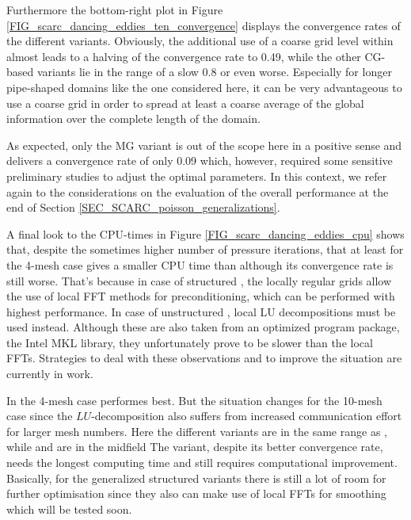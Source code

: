Furthermore the bottom-right plot in Figure \ref{FIG_scarc_dancing_eddies_ten_convergence} displays the convergence rates of the different \scarc{} variants. 
Obviously, the additional use of a coarse grid level within \scarctwolevel{} almost leads to a halving of the convergence rate to 0.49, while the other CG-based variants lie in the range of a slow 0.8 or even worse. Especially for longer pipe-shaped domains like the one considered here, it can be very advantageous to use a coarse grid in order to spread at least a coarse average of the global information over the complete length of the domain. 

As expected, only the MG variant is out of the scope here in a positive sense and delivers a convergence rate of only 0.09 which, however, required some sensitive preliminary studies to adjust the optimal parameters. In this context, we refer again to the considerations on the evaluation of the overall performance at the end of Section \ref{SEC_SCARC_poisson_generalizations}.
 

A final look to the CPU-times in Figure \ref{FIG_scarc_dancing_eddies_cpu} shows that, 
despite the sometimes higher number of pressure iterations, that at least for the 4-mesh case \scarctight{} gives a smaller CPU time than \uscarc{} although its convergence rate is still worse. That's because
in case of structured \scarc{}, the locally regular grids allow the use of local FFT methods for preconditioning, which can be performed with highest performance. In case of unstructured \uscarc{},  local LU decompositions must be used instead.
Although these are also taken from an optimized program package, the Intel\textsuperscript{\textregistered} MKL library, they unfortunately prove to be slower than the local FFTs. Strategies to deal with these observations and to improve the situation are currently in work. 

In the 4-mesh case \uglmat{} performes best. But the situation changes for the 10-mesh case since the $LU$-decomposition  also suffers from increased communication effort for larger mesh numbers. Here the different \scarc{} variants are in the same range as \ffttight{}, while \uglmat{} and \scarcmultigrid{} are in the midfield 
The \scarctwolevel{} variant, despite its better convergence rate, needs the longest computing time and still requires computational improvement.
Basically, for the generalized structured \scarc{} variants there is still a
lot of room for further optimisation since they also can make use of local FFTs for smoothing which will be tested soon.



